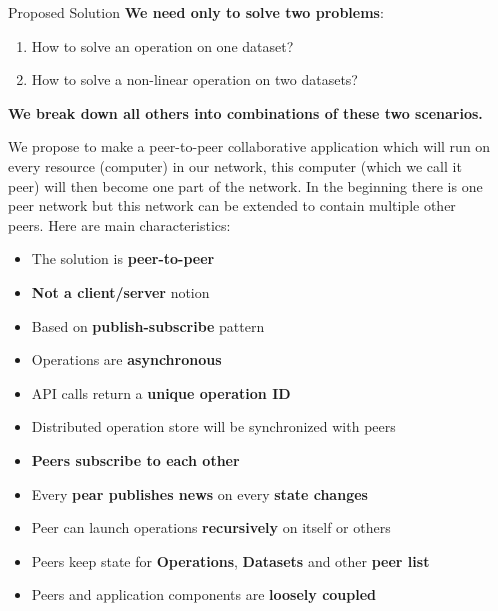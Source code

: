 \documentclass[final,hyperref={pdfpagelabels=true}]{beamer}
\begin{document}
\begin{frame}
\begin{columns}[t]
\begin{column}{.45\textwidth}
    \end{column}

    \begin{column}{.45\textwidth}

      \begin{block}{Proposed Solution}
      \textbf{We need only to solve two problems}:
      \begin{enumerate}
      \item How to solve an operation on one dataset?
      \item How to solve a non-linear operation on two datasets?
      \end{enumerate}
      \textbf{We break down all others into combinations of these two scenarios.}
      
      We propose to make a peer-to-peer collaborative application which will run on every resource 
      (computer) in our network, this computer (which we call it peer) will then become one part of 
      the network. In the beginning there is one peer network but this network can be extended to contain
      multiple other peers. Here are main characteristics:
      \begin{itemize}
      \item The solution is \textbf{peer-to-peer}
      \item \textbf{Not a client/server} notion
      \item Based on \textbf{publish-subscribe} pattern
      \item Operations are \textbf{asynchronous}
      \item API calls return a \textbf{unique operation ID}
      \item Distributed operation store will be synchronized with peers
      \item \textbf{Peers subscribe to each other}
      \item Every \textbf{pear publishes news} on every \textbf{state changes}
      \item Peer can launch operations \textbf{recursively} on itself or others
      \item Peers keep state for \textbf{Operations}, \textbf{Datasets} and other \textbf{peer list}
      \item Peers and application components are \textbf{loosely coupled}
      \end{itemize}
      

\end{block}
\end{column}
\end{columns}
\end{frame}
\end{document}

